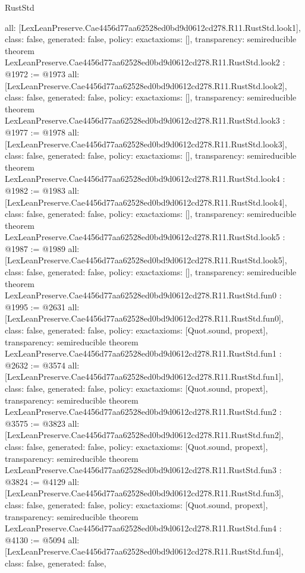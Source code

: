 \begin{lexlean}{RustStd}
\begin{coremodule}
{  all: [LexLeanPreserve.Cae4456d77aa62528ed0bd9d0612cd278.R11.RustStd.look1],
  class: false,
  generated: false,
  policy: exact{axioms: []},
  transparency: semireducible
}
theorem LexLeanPreserve.Cae4456d77aa62528ed0bd9d0612cd278.R11.RustStd.look2 : @1972 := @1973 {
  all: [LexLeanPreserve.Cae4456d77aa62528ed0bd9d0612cd278.R11.RustStd.look2],
  class: false,
  generated: false,
  policy: exact{axioms: []},
  transparency: semireducible
}
theorem LexLeanPreserve.Cae4456d77aa62528ed0bd9d0612cd278.R11.RustStd.look3 : @1977 := @1978 {
  all: [LexLeanPreserve.Cae4456d77aa62528ed0bd9d0612cd278.R11.RustStd.look3],
  class: false,
  generated: false,
  policy: exact{axioms: []},
  transparency: semireducible
}
theorem LexLeanPreserve.Cae4456d77aa62528ed0bd9d0612cd278.R11.RustStd.look4 : @1982 := @1983 {
  all: [LexLeanPreserve.Cae4456d77aa62528ed0bd9d0612cd278.R11.RustStd.look4],
  class: false,
  generated: false,
  policy: exact{axioms: []},
  transparency: semireducible
}
theorem LexLeanPreserve.Cae4456d77aa62528ed0bd9d0612cd278.R11.RustStd.look5 : @1987 := @1989 {
  all: [LexLeanPreserve.Cae4456d77aa62528ed0bd9d0612cd278.R11.RustStd.look5],
  class: false,
  generated: false,
  policy: exact{axioms: []},
  transparency: semireducible
}
theorem LexLeanPreserve.Cae4456d77aa62528ed0bd9d0612cd278.R11.RustStd.fun0 : @1995 := @2631 {
  all: [LexLeanPreserve.Cae4456d77aa62528ed0bd9d0612cd278.R11.RustStd.fun0],
  class: false,
  generated: false,
  policy: exact{axioms: [Quot.sound, propext]},
  transparency: semireducible
}
theorem LexLeanPreserve.Cae4456d77aa62528ed0bd9d0612cd278.R11.RustStd.fun1 : @2632 := @3574 {
  all: [LexLeanPreserve.Cae4456d77aa62528ed0bd9d0612cd278.R11.RustStd.fun1],
  class: false,
  generated: false,
  policy: exact{axioms: [Quot.sound, propext]},
  transparency: semireducible
}
theorem LexLeanPreserve.Cae4456d77aa62528ed0bd9d0612cd278.R11.RustStd.fun2 : @3575 := @3823 {
  all: [LexLeanPreserve.Cae4456d77aa62528ed0bd9d0612cd278.R11.RustStd.fun2],
  class: false,
  generated: false,
  policy: exact{axioms: [Quot.sound, propext]},
  transparency: semireducible
}
theorem LexLeanPreserve.Cae4456d77aa62528ed0bd9d0612cd278.R11.RustStd.fun3 : @3824 := @4129 {
  all: [LexLeanPreserve.Cae4456d77aa62528ed0bd9d0612cd278.R11.RustStd.fun3],
  class: false,
  generated: false,
  policy: exact{axioms: [Quot.sound, propext]},
  transparency: semireducible
}
theorem LexLeanPreserve.Cae4456d77aa62528ed0bd9d0612cd278.R11.RustStd.fun4 : @4130 := @5094 {
  all: [LexLeanPreserve.Cae4456d77aa62528ed0bd9d0612cd278.R11.RustStd.fun4],
  class: false,
  generated: false,
}
\end{coremodule}
\end{lexlean}

